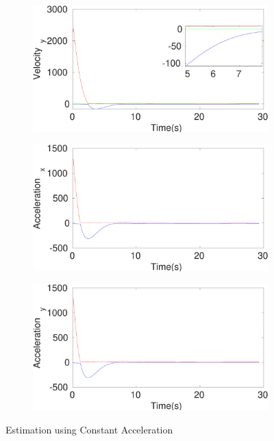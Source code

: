 \begin{figure}[h]
\begin{subfigure}{.5\linewidth}
\end{subfigure}
\begin{subfigure}{.5\linewidth}
\centering
\includegraphics[width=\linewidth]{figures/Prad/s3capradVelocity_y}
\end{subfigure}
\begin{subfigure}{.5\linewidth}
\centering
\includegraphics[width=\linewidth]{figures/Prad/s3capradAcceleration_x}
\end{subfigure}
\begin{subfigure}{.5\linewidth}
\centering
\includegraphics[width=\linewidth]{figures/Prad/s3capradAcceleration_y}
\end{subfigure}
\caption{Estimation using Constant Acceleration}
\end{figure}

